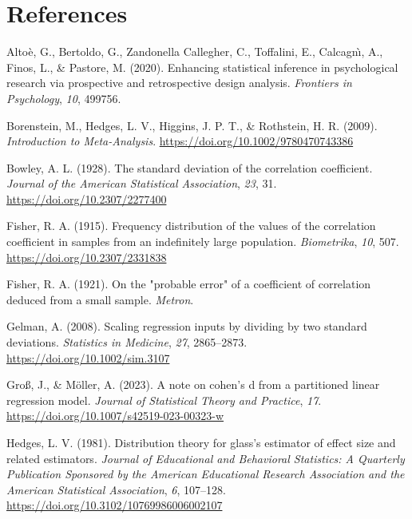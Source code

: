 \documentclass[
  man]{apa7}
\newlength{\cslhangindent}
\newlength{\cslentryspacingunit} %
\newenvironment{CSLReferences}[2] %
 {%
  \setlength{\parindent}{0pt}
  \ifodd #1
  \let\oldpar\par
  \def\par{\hangindent=\cslhangindent\oldpar}
  \fi
  \setlength{\parskip}{#2\cslentryspacingunit}
 }%
 {}
\begin{document}
\newpage

\hypertarget{references}{%
\section{References}\label{references}}

\hypertarget{refs}{}
\begin{CSLReferences}{1}{0}
\leavevmode{}%
Altoè, G., Bertoldo, G., Zandonella Callegher, C., Toffalini, E., Calcagnı̀, A., Finos, L., \& Pastore, M. (2020). Enhancing statistical inference in psychological research via prospective and retrospective design analysis. \emph{Frontiers in Psychology}, \emph{10}, 499756.

\leavevmode{}%
Borenstein, M., Hedges, L. V., Higgins, J. P. T., \& Rothstein, H. R. (2009). \emph{Introduction to {Meta-Analysis}}. \url{https://doi.org/10.1002/9780470743386}

\leavevmode{}%
Bowley, A. L. (1928). The standard deviation of the correlation coefficient. \emph{Journal of the American Statistical Association}, \emph{23}, 31. \url{https://doi.org/10.2307/2277400}

\leavevmode{}%
Fisher, R. A. (1915). Frequency distribution of the values of the correlation coefficient in samples from an indefinitely large population. \emph{Biometrika}, \emph{10}, 507. \url{https://doi.org/10.2307/2331838}

\leavevmode{}%
Fisher, R. A. (1921). On the "probable error" of a coefficient of correlation deduced from a small sample. \emph{Metron}.

\leavevmode{}%
Gelman, A. (2008). Scaling regression inputs by dividing by two standard deviations. \emph{Statistics in Medicine}, \emph{27}, 2865--2873. \url{https://doi.org/10.1002/sim.3107}

\leavevmode{}%
Groß, J., \& Möller, A. (2023). A note on cohen's d from a partitioned linear regression model. \emph{Journal of Statistical Theory and Practice}, \emph{17}. \url{https://doi.org/10.1007/s42519-023-00323-w}

\leavevmode{}%
Hedges, L. V. (1981). Distribution theory for glass's estimator of effect size and related estimators. \emph{Journal of Educational and Behavioral Statistics: A Quarterly Publication Sponsored by the American Educational Research Association and the American Statistical Association}, \emph{6}, 107--128. \url{https://doi.org/10.3102/10769986006002107}


\end{CSLReferences}
\end{document}

